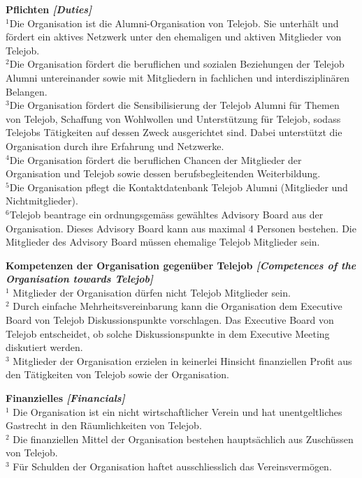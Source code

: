 \documentclass[10pt]{article}
\newcounter{qcounter}
\begin{document}
\begin{list}{{\bf Artikel :~}}{}
\item {\bf Pflichten {\it [Duties]}}\\
$^{1}$Die Organisation ist die Alumni-Organisation von Telejob. Sie unterh\"alt und f\"ordert ein aktives Netzwerk unter den ehemaligen und aktiven Mitglieder von Telejob.\\
$^{2}$Die Organisation f\"ordert die beruflichen und sozialen Beziehungen der Telejob Alumni untereinander sowie mit Mitgliedern in fachlichen und interdisziplin\"aren Belangen.\\
$^{3}$Die Organisation f\"ordert die Sensibilisierung der Telejob Alumni f\"ur Themen von Telejob, Schaffung von Wohlwollen und Unterst\"utzung f\"ur Telejob, sodass Telejobs T\"atigkeiten auf dessen Zweck ausgerichtet sind. Dabei unterst\"utzt die Organisation durch ihre Erfahrung und Netzwerke. \\
$^{4}$Die Organisation f\"ordert die beruflichen Chancen der Mitglieder der Organisation und Telejob sowie dessen berufsbegleitenden Weiterbildung.\\
$^{5}$Die Organisation pflegt die Kontaktdatenbank Telejob Alumni (Mitglieder und Nichtmitglieder).\\
$^{6}$Telejob beantrage ein ordnungsgem\"ass gew\"ahltes Advisory Board aus der Organisation. Dieses Advisory Board kann aus maximal 4 Personen bestehen. Die Mitglieder des Advisory Board m\"ussen ehemalige Telejob Mitglieder sein.

\item {\bf Kompetenzen der Organisation gegen\"uber Telejob {\it [Competences of the Organisation towards Telejob]}}\\
$^{1}$ Mitglieder der Organisation d\"urfen nicht Telejob Mitglieder sein.\\
$^{2}$ Durch einfache Mehrheitsvereinbarung kann die Organisation dem Executive Board von Telejob Diskussionspunkte vorschlagen. Das Executive Board von Telejob entscheidet, ob solche Diskussionspunkte in dem Executive Meeting diskutiert werden.\\
$^{3}$ Mitglieder der Organisation erzielen in keinerlei Hinsicht finanziellen Profit aus den T\"atigkeiten von Telejob sowie der Organisation. 


\item {\bf Finanzielles {\it[Financials]}}\\
$^{1}$ Die Organisation ist ein nicht wirtschaftlicher Verein und hat unentgeltliches Gastrecht in den R\"aumlichkeiten von Telejob.\\
$^{2}$ Die finanziellen Mittel der Organisation bestehen haupts\"achlich aus Zusch\"ussen von Telejob.\\
$^{3}$ F\"ur Schulden der Organisation haftet ausschliesslich das Vereinsverm\"ogen.\\


\end{list}
\end{document}
